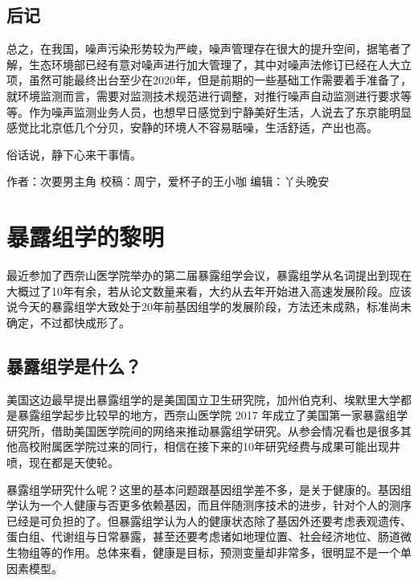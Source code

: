 \documentclass[
]{book}
\begin{document}
\hypertarget{ux540eux8bb0-2}{%
\subsection{后记}\label{ux540eux8bb0-2}}

总之，在我国，噪声污染形势较为严峻，噪声管理存在很大的提升空间，据笔者了解，生态环境部已经有意对噪声进行加大管理了，其中对噪声法修订已经在人大立项，虽然可能最终出台至少在2020年，但是前期的一些基础工作需要着手准备了，就环境监测而言，需要对监测技术规范进行调整，对推行噪声自动监测进行要求等等。作为噪声监测业务人员，也想早日感觉到宁静美好生活，人说去了东京能明显感觉比北京低几个分贝，安静的环境人不容易聒噪，生活舒适，产出也高。

俗话说，静下心来干事情。

作者：次要男主角
校稿：周宁，爱杯子的王小咖
编辑：丫头晚安

\hypertarget{ux66b4ux9732ux7ec4ux5b66ux7684ux9eceux660e}{%
\section{暴露组学的黎明}\label{ux66b4ux9732ux7ec4ux5b66ux7684ux9eceux660e}}

最近参加了西奈山医学院举办的第二届暴露组学会议，暴露组学从名词提出到现在大概过了10年有余，若从论文数量来看，大约从去年开始进入高速发展阶段。应该说今天的暴露组学大致处于20年前基因组学的发展阶段，方法还未成熟，标准尚未确定，不过都快成形了。

\hypertarget{ux66b4ux9732ux7ec4ux5b66ux662fux4ec0ux4e48}{%
\subsection{暴露组学是什么？}\label{ux66b4ux9732ux7ec4ux5b66ux662fux4ec0ux4e48}}

美国这边最早提出暴露组学的是美国国立卫生研究院，加州伯克利、埃默里大学都是暴露组学起步比较早的地方，西奈山医学院 2017 年成立了美国第一家暴露组学研究所，借助美国医学院间的网络来推动暴露组学研究。从参会情况看也是很多其他高校附属医学院过来的同行，相信在接下来的10年研究经费与成果可能出现井喷，现在都是天使轮。

暴露组学研究什么呢？这里的基本问题跟基因组学差不多，是关于健康的。基因组学认为一个人健康与否更多依赖基因，而且伴随测序技术的进步，针对个人的测序已经是可负担的了。但暴露组学认为人的健康状态除了基因外还要考虑表观遗传、蛋白组、代谢组与日常暴露，甚至还要考虑诸如地理位置、社会经济地位、肠道微生物组等的作用。总体来看，健康是目标，预测变量却非常多，很明显不是一个单因素模型。
\end{document}
